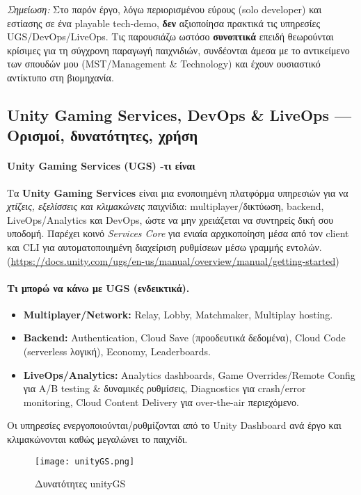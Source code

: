  \textit{Σημείωση:} Στο παρόν έργο, λόγω περιορισμένου εύρους (solo developer) και εστίασης σε ένα playable tech-demo, \textbf{δεν} αξιοποίησα πρακτικά τις υπηρεσίες UGS/DevOps/LiveOps. Τις παρουσιάζω ωστόσο \textbf{συνοπτικά} επειδή θεωρούνται κρίσιμες για τη σύγχρονη παραγωγή παιχνιδιών, συνδέονται άμεσα με το αντικείμενο των σπουδών μου (MST/Management \& Technology) και έχουν ουσιαστικό αντίκτυπο στη βιομηχανία.
 

\subsection{Unity Gaming Services, DevOps \& LiveOps — Ορισμοί, δυνατότητες, χρήση}

\paragraph*{Unity Gaming Services (UGS) -τι είναι}
Τα \textbf{Unity Gaming Services} είναι μια ενοποιημένη πλατφόρμα υπηρεσιών για να \emph{χτίζεις, εξελίσσεις και κλιμακώνεις} παιχνίδια: multiplayer/δικτύωση, backend, LiveOps/Analytics και DevOps, ώστε να μην χρειάζεται να συντηρείς δική σου υποδομή. Παρέχει κοινό \emph{Services Core} για ενιαία αρχικοποίηση μέσα από τον client και CLI για αυτοματοποιημένη διαχείριση ρυθμίσεων μέσω γραμμής εντολών.(\href{https://docs.unity.com/ugs/en-us/manual/overview/manual/getting-started}{https://docs.unity.com/ugs/en-us/manual/overview/manual/getting-started})

\paragraph{Τι μπορώ να κάνω με UGS (ενδεικτικά).}
\begin{itemize}
  \item \textbf{Multiplayer/Network:} Relay, Lobby, Matchmaker, Multiplay hosting.
  \item \textbf{Backend:} Authentication, Cloud Save (προοδευτικά δεδομένα), Cloud Code (serverless λογική), Economy, Leaderboards.
  \item \textbf{LiveOps/Analytics:} Analytics dashboards, Game Overrides/Remote Config για A/B testing \& δυναμικές ρυθμίσεις, Diagnostics για crash/error monitoring, Cloud Content Delivery για over-the-air περιεχόμενο.
\end{itemize}
Οι υπηρεσίες ενεργοποιούνται/ρυθμίζονται από το Unity Dashboard ανά έργο και κλιμακώνονται καθώς μεγαλώνει το παιχνίδι.

\begin{figure}[H]
    \centering
    \texttt{[image: unityGS.png]}
    \caption{Δυνατότητες unityGS }
    \label{fig:placeholder}
\end{figure}

